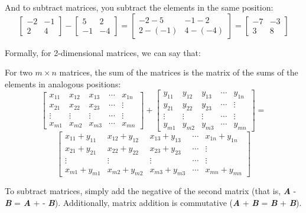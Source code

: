 And to subtract matrices, you subtract the elements in the same position:
$$\begin{bmatrix}
-2 & -1\\
2 & 4
\end{bmatrix}
- \begin{bmatrix}
5 & 2\\
-1 & -4
\end{bmatrix}
= \begin{bmatrix}
-2 - 5 & -1 - 2\\
2 - (-1) & 4 - (-4)
\end{bmatrix} = 
\begin{bmatrix}
-7 & -3\\
3 & 8
\end{bmatrix}$$

Formally, for 2-dimensional matrices, we can say that:
\begin{mdframed}[style = important, frametitle={Adding and Subtracting Matrics}]
For two $m \times n$ matrices, the sum of the matrices is the matrix of the 
sums of the elements in analogous positions:
$$\begin{bmatrix}
x_{11} & x_{12} & x_{13} & \cdots & x_{1n}\\
x_{21} & x_{22} & x_{23} & \cdots & \vdots\\
\vdots & \vdots & \vdots & \cdots & \vdots\\
x_{m1} & x_{m2} & x_{m3} & \cdots & x_{mn}
\end{bmatrix}
+ \begin{bmatrix}
y_{11} & y_{12} & y_{13} & \cdots & y_{1n}\\
y_{21} & y_{22} & y_{23} & \cdots & \vdots\\
\vdots & \vdots & \vdots & \cdots & \vdots\\
y_{m1} & y_{m2} & y_{m3} & \cdots & y_{mn}
\end{bmatrix} = $$
$$\begin{bmatrix}
x_{11} + y_{11} & x_{12} + y_{12} & x_{13} + y_{13} & \cdots & x_{1n} + y_{1n}\\
x_{21} + y_{21} & x_{22} + y_{22} & x_{23} + y_{23} & \cdots & \vdots\\
\vdots & \vdots & \vdots & \cdots & \vdots\\
x_{m1} + y_{m1} & x_{m2} + y_{m2} & x_{m3} + y_{m3} & \cdots & x_{mn} + y_{mn}
\end{bmatrix}$$

To subtract matrices, simply add the negative of the second matrix (that is, 
\textbf{\textit{A}} - \textbf{\textit{B}} = \textbf{\textit{A}} + -\textbf{
\textit{B}}). Additionally, matrix addition is commutative (\textbf{\textit{A}}
+ \textbf{\textit{B}} = \textbf{\textit{B}} + \textbf{\textit{B}}).
\end{mdframed}

